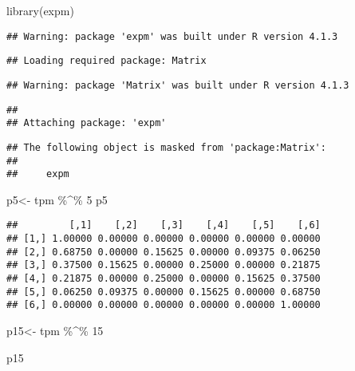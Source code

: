 \documentclass[
]{article}
\newenvironment{Shaded}{\begin{snugshade}}{\end{snugshade}}
\newcommand{\DecValTok}[1]{\textcolor[rgb]{0.00,0.00,0.81}{#1}}
\newcommand{\FunctionTok}[1]{\textcolor[rgb]{0.00,0.00,0.00}{#1}}
\newcommand{\NormalTok}[1]{#1}
\newcommand{\OtherTok}[1]{\textcolor[rgb]{0.56,0.35,0.01}{#1}}
\newcommand{\SpecialCharTok}[1]{\textcolor[rgb]{0.00,0.00,0.00}{#1}}
\begin{document}
\begin{Shaded}
\begin{Highlighting}[]
 \FunctionTok{library}\NormalTok{(expm)   }
\end{Highlighting}
\end{Shaded}

\begin{verbatim}
## Warning: package 'expm' was built under R version 4.1.3
\end{verbatim}

\begin{verbatim}
## Loading required package: Matrix
\end{verbatim}

\begin{verbatim}
## Warning: package 'Matrix' was built under R version 4.1.3
\end{verbatim}

\begin{verbatim}
## 
## Attaching package: 'expm'
\end{verbatim}

\begin{verbatim}
## The following object is masked from 'package:Matrix':
## 
##     expm
\end{verbatim}

\begin{Shaded}
\begin{Highlighting}[]
\NormalTok{  p5}\OtherTok{\textless{}{-}}\NormalTok{ tpm }\SpecialCharTok{\%\^{}\%} \DecValTok{5}
\NormalTok{  p5}
\end{Highlighting}
\end{Shaded}

\begin{verbatim}
##         [,1]    [,2]    [,3]    [,4]    [,5]    [,6]
## [1,] 1.00000 0.00000 0.00000 0.00000 0.00000 0.00000
## [2,] 0.68750 0.00000 0.15625 0.00000 0.09375 0.06250
## [3,] 0.37500 0.15625 0.00000 0.25000 0.00000 0.21875
## [4,] 0.21875 0.00000 0.25000 0.00000 0.15625 0.37500
## [5,] 0.06250 0.09375 0.00000 0.15625 0.00000 0.68750
## [6,] 0.00000 0.00000 0.00000 0.00000 0.00000 1.00000
\end{verbatim}

\begin{Shaded}
\begin{Highlighting}[]
\NormalTok{p15}\OtherTok{\textless{}{-}}\NormalTok{ tpm }\SpecialCharTok{\%\^{}\%} \DecValTok{15}

\NormalTok{p15}
\end{Highlighting}
\end{Shaded}
\end{document}
